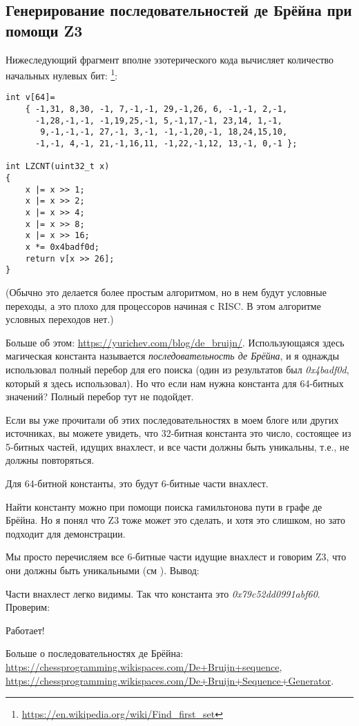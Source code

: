\subsection{Генерирование последовательностей де Брёйна при помощи Z3}
\label{DeBruijnZ3}

Нижеследующий фрагмент вполне эзотерического кода вычисляет количество начальных нулевых бит:
\footnote{\url{https://en.wikipedia.org/wiki/Find_first_set}}:

\begin{lstlisting}
int v[64]=
	{ -1,31, 8,30, -1, 7,-1,-1, 29,-1,26, 6, -1,-1, 2,-1,
	  -1,28,-1,-1, -1,19,25,-1, 5,-1,17,-1, 23,14, 1,-1,
	   9,-1,-1,-1, 27,-1, 3,-1, -1,-1,20,-1, 18,24,15,10,
	  -1,-1, 4,-1, 21,-1,16,11, -1,22,-1,12, 13,-1, 0,-1 };

int LZCNT(uint32_t x)
{
    x |= x >> 1;
    x |= x >> 2;
    x |= x >> 4;
    x |= x >> 8;
    x |= x >> 16;
    x *= 0x4badf0d;
    return v[x >> 26];
}
\end{lstlisting}

(Обычно это делается более простым алгоритмом, но в нем будут условные переходы,
а это плохо для процессоров начиная с RISC. В этом алгоритме условных переходов нет.)

Больше об этом: \url{https://yurichev.com/blog/de_bruijn/}.
Использующаяся здесь магическая константа называется \textit{последовательность де Брёйна},
и я однажды использовал полный перебор для его поиска (один из результатов был \textit{0x4badf0d},
который я здесь использовал).
Но что если нам нужна константа для 64-битных значений?
Полный перебор тут не подойдет.

Если вы уже прочитали об этих последовательностях в моем блоге или других источниках,
вы можете увидеть, что 32-битная константа это число, состоящее из 5-битных частей, идущих внахлест,
и все части должны быть уникальны, т.е., не должны повторяться.

Для 64-битной константы, это будут 6-битные части внахлест.

Найти константу можно при помощи поиска гамильтонова пути в графе де Брёйна.
Но я понял что Z3 тоже может это сделать, и хотя это слишком, но зато подходит для демонстрации.



Мы просто перечисляем все 6-битные части идущие внахлест и говорим Z3, что они должны быть уникальными (см ).
Вывод:



Части внахлест легко видимы.
Так что константа это \textit{0x79c52dd0991abf60}.
Проверим:



Работает!

Больше о последовательностях де Брёйна:
\url{https://chessprogramming.wikispaces.com/De+Bruijn+sequence},
\url{https://chessprogramming.wikispaces.com/De+Bruijn+Sequence+Generator}.

